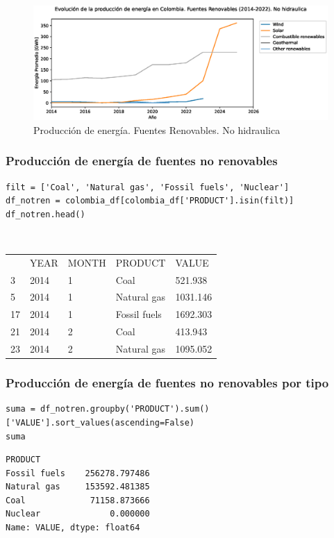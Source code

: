 \documentclass{article}
\begin{document}
\begin{figure}[t]
	\centering
	\includegraphics[width=0.7\linewidth]{fig_15}
	\caption{Producción de energía. Fuentes Renovables. No hidraulica}
	\label{fig:fig15}
\end{figure}


\subsubsection{Producción de energía de fuentes no renovables}

\begin{verbatim}
filt = ['Coal', 'Natural gas', 'Fossil fuels', 'Nuclear']
df_notren = colombia_df[colombia_df['PRODUCT'].isin(filt)]
df_notren.head()	
\end{verbatim}

{\tt
\begin{tabular}{lllll}
	& YEAR & MONTH & PRODUCT      & VALUE    \\
	3  & 2014 & 1     & Coal         & 521.938  \\
	5  & 2014 & 1     & Natural gas  & 1031.146 \\
	17 & 2014 & 1     & Fossil fuels & 1692.303 \\
	21 & 2014 & 2     & Coal         & 413.943  \\
	23 & 2014 & 2     & Natural gas  & 1095.052
\end{tabular}
}

\subsubsection{Producción de energía de fuentes no renovables por tipo}

\begin{verbatim}
suma = df_notren.groupby('PRODUCT').sum()['VALUE'].sort_values(ascending=False)
suma	
\end{verbatim}

\begin{verbatim}
PRODUCT
Fossil fuels    256278.797486
Natural gas     153592.481385
Coal             71158.873666
Nuclear              0.000000
Name: VALUE, dtype: float64
\end{verbatim}
\end{document}

